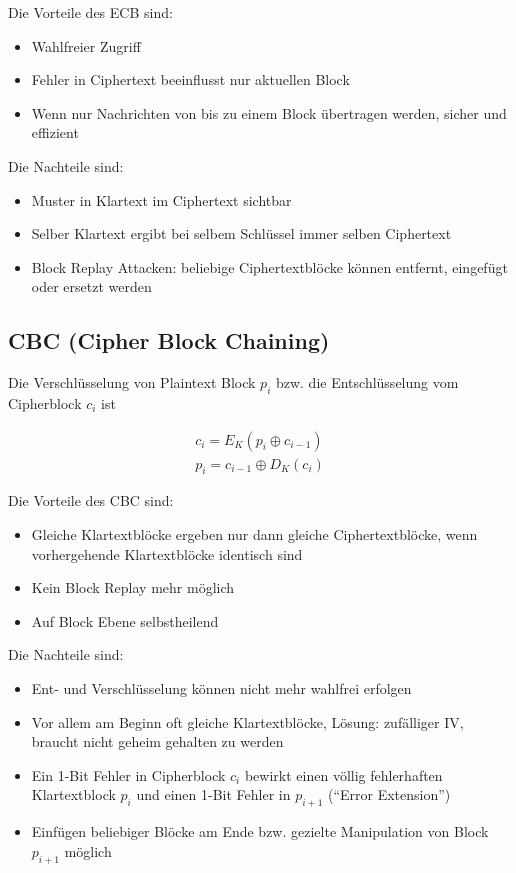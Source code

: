 Die Vorteile des ECB sind: 

\begin{itemize}
    \item Wahlfreier Zugriff
    \item Fehler in Ciphertext beeinflusst nur aktuellen Block
    \item Wenn nur Nachrichten von bis zu einem Block übertragen werden, sicher und effizient
\end{itemize}

Die Nachteile sind:

\begin{itemize}
    \item Muster in Klartext im Ciphertext sichtbar
    \item Selber Klartext ergibt bei selbem Schlüssel immer selben Ciphertext
    \item Block Replay Attacken: beliebige Ciphertextblöcke können entfernt, eingefügt oder ersetzt werden
\end{itemize}


\subsection{CBC (Cipher Block Chaining)}

Die Verschlüsselung von Plaintext Block $p_i$ bzw. die Entschlüsselung vom Cipherblock $c_i$ ist

\begin{align*}
    c_i = E_K(p_i \oplus c_{i-1}) \\
    p_i = c_{i-1} \oplus D_K(c_i)
\end{align*}

Die Vorteile des CBC sind: 

\begin{itemize}
    \item Gleiche Klartextblöcke ergeben nur dann gleiche Ciphertextblöcke, wenn vorhergehende Klartextblöcke identisch sind
    \item Kein Block Replay mehr möglich
    \item Auf Block Ebene selbstheilend
\end{itemize}

Die Nachteile sind:

\begin{itemize}
    \item Ent- und Verschlüsselung können nicht mehr wahlfrei erfolgen
    \item Vor allem am Beginn oft gleiche Klartextblöcke, Lösung: zufälliger IV, braucht nicht geheim gehalten zu werden
    \item Ein 1-Bit Fehler in Cipherblock $c_i$ bewirkt einen völlig fehlerhaften Klartextblock $p_i$ und einen 1-Bit Fehler in $p_{i+1}$ (``Error Extension'')
    \item Einfügen beliebiger Blöcke am Ende bzw. gezielte Manipulation von Block $p_{i+1}$ möglich
\end{itemize}

